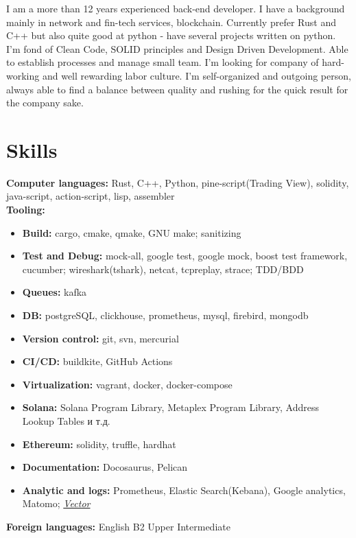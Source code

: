 \documentclass[letterpaper,11pt]{article}
\newcommand{\resumeSubHeadingListStart}{\begin{itemize}[leftmargin=0.15in, label={}]}
\newcommand{\resumeSubHeadingListEnd}{\end{itemize}}
\begin{document}
I am a more than 12 years experienced back-end developer. I have a background mainly in  network and fin-tech services, blockchain. Currently prefer Rust and C++ but also quite good at python - have several projects written on python. I'm fond of Clean Code, SOLID principles and Design Driven Development.
Able to establish processes and manage small team. I'm looking for company of hard-working and well rewarding labor culture. I'm self-organized and outgoing person, always able to find a balance between quality and rushing for the quick result for the company sake.


\section{Skills}
  \vspace{3pt}
  \resumeSubHeadingListStart
    \small{\item{
        \textbf{Computer languages:}{ Rust, C++, Python, pine-script(Trading View), solidity, java-script, action-script, lisp, assembler } \\
        \textbf{Tooling: }\begin{itemize}[topsep=0pt,itemsep=0.1pt]
            \item\textbf{Build: }{ cargo, cmake, qmake, GNU make; sanitizing}
            \item\textbf{Test and Debug: }{ mock-all, google test, google mock, boost test framework, cucumber; wireshark(tshark), netcat, tcpreplay, strace; TDD/BDD }
            \item\textbf{Queues: }{kafka }
            \item\textbf{DB: }{postgreSQL, clickhouse, prometheus, mysql, firebird, mongodb }
            \item\textbf{Version control: }{git, svn, mercurial}
            \item\textbf{CI/CD: }{buildkite, GitHub Actions}
            \item\textbf{Virtualization: }{vagrant, docker, docker-compose}
            \item\textbf{Solana: }{Solana Program Library, Metaplex Program Library, Address Lookup Tables и т.д.}
            \item\textbf{Ethereum: }{solidity, truffle, hardhat}
            \item\textbf{Documentation: }{ Docosaurus, Pelican }
            \item\textbf{Analytic and logs: }{ Prometheus, Elastic Search(Kebana), Google analytics, Matomo; \emph{\href{https://vector.dev/}{\color{blue}Vector}} }
        \end{itemize}
        \textbf{Foreign languages:}{ English B2 Upper Intermediate } 
    }}
  \resumeSubHeadingListEnd
\end{document}
